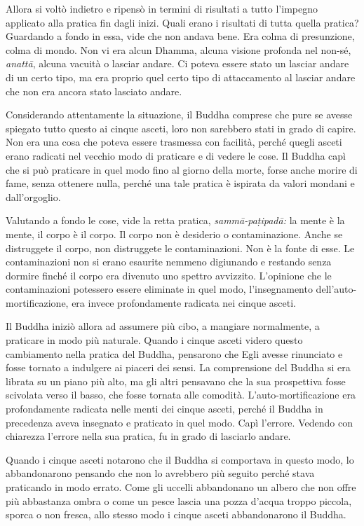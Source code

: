 Allora si voltò indietro e ripensò in termini di risultati a tutto
l'impegno applicato alla pratica fin dagli inizi. Quali erano i
risultati di tutta quella pratica? Guardando a fondo in essa, vide che
non andava bene. Era colma di presunzione, colma di mondo. Non vi era
alcun Dhamma, alcuna visione profonda nel non-sé, \emph{anattā}, alcuna
vacuità o lasciar andare. Ci poteva essere stato un lasciar andare di un
certo tipo, ma era proprio quel certo tipo di attaccamento al lasciar
andare che non era ancora stato lasciato andare.

Considerando attentamente la situazione, il Buddha comprese che pure se
avesse spiegato tutto questo ai cinque asceti, loro non sarebbero stati
in grado di capire. Non era una cosa che poteva essere trasmessa con
facilità, perché quegli asceti erano radicati nel vecchio modo di
praticare e di vedere le cose. Il Buddha capì che si può praticare in
quel modo fino al giorno della morte, forse anche morire di fame, senza
ottenere nulla, perché una tale pratica è ispirata da valori mondani e
dall'orgoglio.

Valutando a fondo le cose, vide la retta pratica, \emph{sammā-paṭipadā:}
la mente è la mente, il corpo è il corpo. Il corpo non è desiderio o
contaminazione. Anche se distruggete il corpo, non distruggete le
contaminazioni. Non è la fonte di esse. Le contaminazioni non si erano
esaurite nemmeno digiunando e restando senza dormire finché il corpo era
divenuto uno spettro avvizzito. L'opinione che le contaminazioni
potessero essere eliminate in quel modo, l'insegnamento
dell'auto-mortificazione, era invece profondamente radicata nei cinque
asceti.

Il Buddha iniziò allora ad assumere più cibo, a mangiare normalmente, a
praticare in modo più naturale. Quando i cinque asceti videro questo
cambiamento nella pratica del Buddha, pensarono che Egli avesse
rinunciato e fosse tornato a indulgere ai piaceri dei sensi. La
comprensione del Buddha si era librata su un piano più alto, ma gli
altri pensavano che la sua prospettiva fosse scivolata verso il basso,
che fosse tornata alle comodità. L'auto-mortificazione era profondamente
radicata nelle menti dei cinque asceti, perché il Buddha in precedenza
aveva insegnato e praticato in quel modo. Capì l'errore. Vedendo con
chiarezza l'errore nella sua pratica, fu in grado di lasciarlo andare.

Quando i cinque asceti notarono che il Buddha si comportava in questo
modo, lo abbandonarono pensando che non lo avrebbero più seguito perché
stava praticando in modo errato. Come gli uccelli abbandonano un albero
che non offre più abbastanza ombra o come un pesce lascia una pozza
d'acqua troppo piccola, sporca o non fresca, allo stesso modo i cinque
asceti abbandonarono il Buddha.

